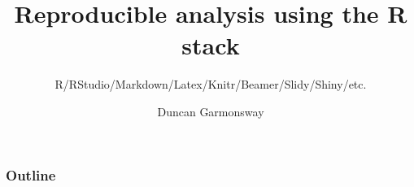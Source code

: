 \documentclass[t]{beamer}
\title{Reproducible analysis using the R stack}
\subtitle{R/RStudio/Markdown/Latex/Knitr/Beamer/Slidy/Shiny/etc.}
\author{Duncan Garmonsway}
\institute{Road Policing Support, NZ Police}
\date{\@date}
\begin{document}
\begin{frame}
\titlepage
\end{frame}

\begin{frame}
\frametitle{Outline}
\tableofcontents
\end{frame}


\end{document}
